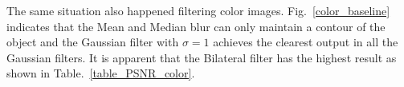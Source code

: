 \documentclass[12pt]{article}
\begin{document}
The same situation also happened filtering color images.
Fig.~\ref{color_baseline} indicates that the Mean and Median blur can only maintain a contour of the object and the Gaussian filter with $\sigma = 1$ achieves the clearest output in all the Gaussian filters. 
It is apparent that the Bilateral filter has the highest result as shown in Table.~\ref{table_PSNR_color}.

\begin{figure}[H]
  \centering
  \quad
  \quad
  \quad


\end{figure}
\end{document}
